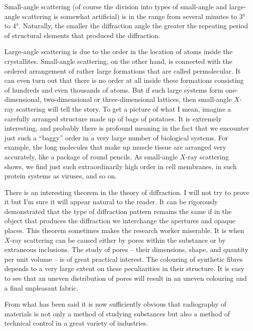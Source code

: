 Small-angle scattering (of course the division into types of small-angle and large-angle scattering is somewhat artificial) is in the range from several minutes to \ang{3} to \ang{4}. Naturally, the smaller the diffraction angle the greater the repeating period of structural elements that produced the diffraction.

Large-angle scattering is due to the order in the loca­tion of atoms inside the crystallites. Small-angle scatter­ing, on the other hand, is connected with the ordered arrangement of rather large formations that are called permolecular. It can even turn out that there is no order at all inside these formations consisting of hundreds and even thousands of atoms. But if such large systems form one-dimensional, two-dimensional or three-dimensional lattices, then small-angle $X$-ray scattering will tell the story. To get a picture of what I mean, imagine a carefully arranged structure made up of bags of potatoes. It is extremely interesting, and probably there is pro­found meaning in the fact that we encounter just such a ``baggy'' order in a very large number of biological sys­tems. For example, the long molecules that make up muscle tissue are arranged very accurately, like a package of round pencils. As small-angle $X$-ray scattering shows, we find just such extraordinarily high order in cell mem­branes, in such protein systems as viruses, and so on.

There is an interesting theorem in the theory of diffrac­tion. I will not try to prove it but I'm sure it will appear natural to the reader. It can be rigorously demonstrated that the type of diffraction pattern remains the same if in the object that produces the diffraction we inter­change the apertures and opaque places. This theorem sometimes makes the research worker miserable. It is when $X$-ray scattering can be caused either by pores within the substance or by extraneous inclusions. The study of pores -- their dimensions, shape, and quantity per unit volume -- is of great practical interest. The colouring of synthetic fibres depends to a very large extent on these peculiarities in their structure. It is easy to see that an uneven distribution of pores will result in an uneven colouring and a final unpleasant fabric.

From what has been said it is now sufficiently obvious that radiography of materials is not only a method of studying substances but also a method of technical con­trol in a great variety of industries.
%



